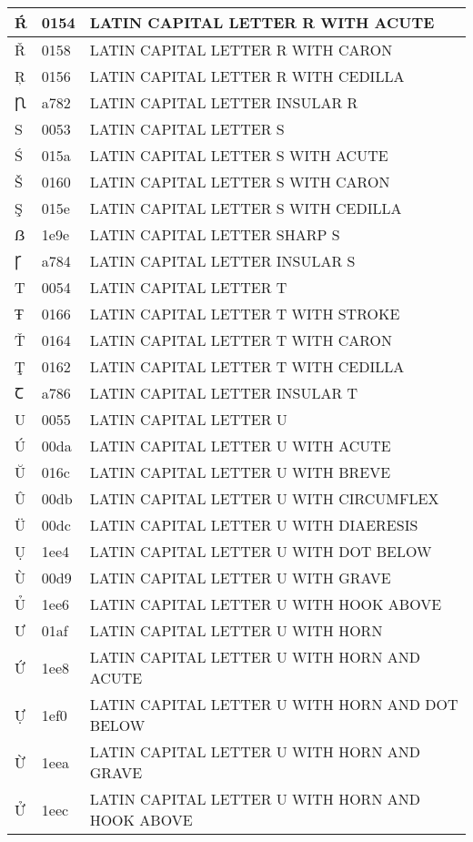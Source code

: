 \documentclass[12pt,letterpaper,openany]{book}
\begin{document}
\begin{center}
\begin{supertabular}{|m{0.25in}|m{0.5in}|m{4in}|}
Ŕ & 0154 & LATIN CAPITAL LETTER R WITH ACUTE\\\hline
Ř & 0158 & LATIN CAPITAL LETTER R WITH CARON\\\hline
Ŗ & 0156 & LATIN CAPITAL LETTER R WITH CEDILLA\\\hline
Ꞃ & a782 & LATIN CAPITAL LETTER INSULAR R\\\hline
S & 0053 & LATIN CAPITAL LETTER S\\\hline
Ś & 015a & LATIN CAPITAL LETTER S WITH ACUTE\\\hline
Š & 0160 & LATIN CAPITAL LETTER S WITH CARON\\\hline
Ş & 015e & LATIN CAPITAL LETTER S WITH CEDILLA\\\hline
ẞ & 1e9e & LATIN CAPITAL LETTER SHARP S\\\hline
Ꞅ & a784 & LATIN CAPITAL LETTER INSULAR S\\\hline
T & 0054 & LATIN CAPITAL LETTER T\\\hline
Ŧ & 0166 & LATIN CAPITAL LETTER T WITH STROKE\\\hline
Ť & 0164 & LATIN CAPITAL LETTER T WITH CARON\\\hline
Ţ & 0162 & LATIN CAPITAL LETTER T WITH CEDILLA\\\hline
Ꞇ & a786 & LATIN CAPITAL LETTER INSULAR T\\\hline
U & 0055 & LATIN CAPITAL LETTER U\\\hline
Ú & 00da & LATIN CAPITAL LETTER U WITH ACUTE\\\hline
Ŭ & 016c & LATIN CAPITAL LETTER U WITH BREVE\\\hline
Û & 00db & LATIN CAPITAL LETTER U WITH CIRCUMFLEX\\\hline
Ü & 00dc & LATIN CAPITAL LETTER U WITH DIAERESIS\\\hline
Ụ & 1ee4 & LATIN CAPITAL LETTER U WITH DOT BELOW\\\hline
Ù & 00d9 & LATIN CAPITAL LETTER U WITH GRAVE\\\hline
Ủ & 1ee6 & LATIN CAPITAL LETTER U WITH HOOK ABOVE\\\hline
Ư & 01af & LATIN CAPITAL LETTER U WITH HORN\\\hline
Ứ & 1ee8 & LATIN CAPITAL LETTER U WITH HORN AND ACUTE\\\hline
Ự & 1ef0 & LATIN CAPITAL LETTER U WITH HORN AND DOT BELOW\\\hline
Ừ & 1eea & LATIN CAPITAL LETTER U WITH HORN AND GRAVE\\\hline
Ử & 1eec & LATIN CAPITAL LETTER U WITH HORN AND HOOK ABOVE\\\hline

\end{supertabular}
\end{center}
\end{document}

